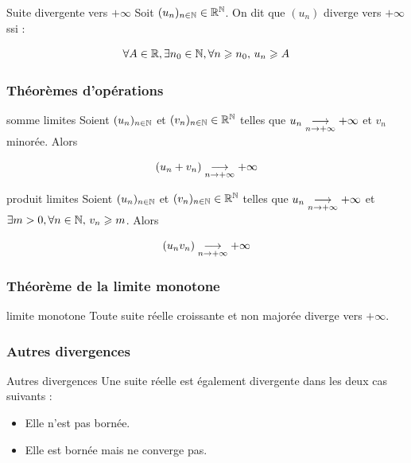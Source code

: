 \begin{definitionnt}{Suite divergente vers $+\infty$}{}
    Soit $(u_n)_{n \in \mathbb{N}} \in \mathbb{R}^{\mathbb{N}}$. On dit que $(u_n)$ diverge vers $+\infty$ ssi : 

    $$\forall A \in \mathbb{R}, \exists n_0 \in \mathbb{N}, \forall n \geqslant n_0, \, u_n \geqslant A$$
    
\end{definitionnt}


\subsubsection{Théorèmes d'opérations}

\begin{theorement}{somme limites }{}
    Soient $(u_n)_{n \in \mathbb{N}}$ et $(v_n)_{n \in \mathbb{N}} \in \mathbb{R}^{\mathbb{N}}$ telles que 
    $u_n \underset{n \to +\infty}{\longrightarrow} +\infty$ et $v_n$ minorée. Alors 

    $$ (u_n + v_n) \underset{n \to +\infty}{\longrightarrow} +\infty $$
\end{theorement}

\begin{theorement}{produit limites}{}
    Soient $(u_n)_{n \in \mathbb{N}}$ et $(v_n)_{n \in \mathbb{N}} \in \mathbb{R}^{\mathbb{N}}$ telles que 
    $u_n \underset{n \to +\infty}{\longrightarrow} +\infty$ et $\exists m > 0, \forall n \in \mathbb{N}, \, v_n \geqslant m$. Alors 

    $$ (u_n v_n) \underset{n \to +\infty}{\longrightarrow} +\infty $$
    
\end{theorement}

\subsubsection{Théorème de la limite monotone}

\begin{theorement}{limite monotone}{}
    Toute suite réelle croissante et non majorée diverge vers $+\infty$.
\end{theorement}

\subsubsection{Autres divergences}

\begin{definitionnt}{Autres divergences}{}
    Une suite réelle est également divergente dans les deux cas suivants : 
    \begin{itemize}
        \item Elle n'est pas bornée. 
        \item Elle est bornée mais ne converge pas.
    \end{itemize}
\end{definitionnt}

